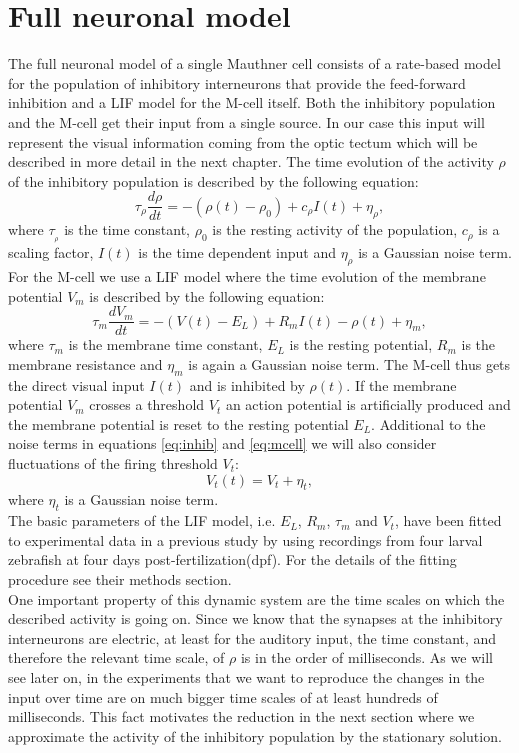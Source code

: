 \documentclass[a4paper,10pt,hidelinks]{scrreprt}
\begin{document}
	\section{Full neuronal model}
	The full neuronal model of a single Mauthner cell consists of a rate-based model for the 
	population of inhibitory interneurons that provide the feed-forward inhibition and a LIF model 
	for the M-cell itself.
	Both the inhibitory population and the M-cell get their input from a single source.
	In our case this input will represent the visual information coming from the optic tectum which 
	will be described in more detail in the next chapter.
	The time evolution of the activity $\rho$ of the inhibitory population is described by the 
	following equation:
	\begin{equation}
	\tau _{\rho} \frac{d\rho}{dt} = - (\rho(t) - \rho_{0}) + c_{\rho} I(t) + 
	\eta _{\rho},
	\label{eq:inhib}
	\end{equation}
	where $\tau _{_\rho}$ is the time constant, $\rho _{0}$ is the resting activity of the 
	population, $c_{\rho}$ is a scaling factor, $I(t)$ is the time dependent input and $\eta 
	_{\rho}$ is a Gaussian noise term.
	For the M-cell we use a LIF model where the time evolution of the membrane potential $V_m$ is 
	described by the following equation:
	\begin{equation}
	\tau _m \frac{dV_m}{dt} = - (V(t) - E_{L}) + R_{m} I(t) - \rho (t) +  \eta 
	_m,
	\label{eq:mcell}
	\end{equation}
	where $\tau_{m}$ is the membrane time constant, $E_L$ is the resting potential, $R_m$ is the 
	membrane resistance and $\eta_{m}$ is again a Gaussian noise term.
	The M-cell thus gets the direct visual input $I(t)$ and is inhibited by $\rho(t)$.
	If the membrane potential $V_m$ crosses a threshold $V_t$ an action potential is artificially 
	produced and the membrane potential is reset to the resting potential $E_L$.
	Additional to the noise terms in equations \ref{eq:inhib} and \ref{eq:mcell} we will also 
	consider fluctuations of the firing threshold $V_t$:
	\begin{equation}
	V_t (t) = V_t + \eta_t,
	\label{eq:thrs}
	\end{equation}
	where $\eta_t$ is a Gaussian noise term.\\
	The basic parameters of the LIF model, i.e. $E_L$, $R_m$, $\tau_m$ and $V_t$, have been fitted 
	to experimental data in a previous study by \cite{Koyama2016} using recordings from four larval 
	zebrafish at four days post-fertilization(dpf).
	For the details of the fitting procedure see their methods section.\\
	One important property of this dynamic system are the time scales on which the described 
	activity is going on.
	Since we know that the synapses at the inhibitory interneurons are electric, at least for the 
	auditory input, the time constant, and therefore the relevant time scale, of $\rho$ is in the 
	order of milliseconds.
	As we will see later on, in the experiments that we want to reproduce the changes in the input 
	over time are on much bigger time scales of at least hundreds of milliseconds.
	This fact motivates the reduction in the next section where we approximate the activity of the 
	inhibitory population by the stationary solution.
\end{document}
